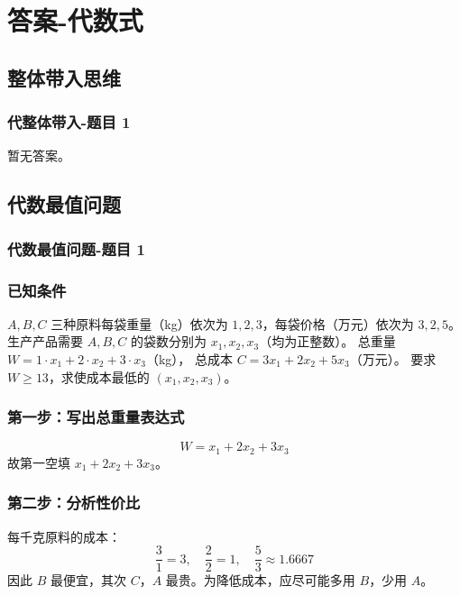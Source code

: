 \chapter{答案-代数式}

\section{整体带入思维}

\subsection{代整体带入-题目 1}

\label{代整体带入-题目 1} 

暂无答案。

\section{代数最值问题}

\subsection{代数最值问题-题目 1}

\label{代数最值问题-题目 1}  %

\subsection*{已知条件}
\(A, B, C\) 三种原料每袋重量（kg）依次为 \(1, 2, 3\)，每袋价格（万元）依次为 \(3, 2, 5\)。  
生产产品需要 \(A, B, C\) 的袋数分别为 \(x_1, x_2, x_3\)（均为正整数）。  
总重量 \(W = 1\cdot x_1 + 2\cdot x_2 + 3\cdot x_3\)（kg），  
总成本 \(C = 3x_1 + 2x_2 + 5x_3\)（万元）。  
要求 \(W \geq 13\)，求使成本最低的 \((x_1, x_2, x_3)\)。

\subsection*{第一步：写出总重量表达式}
\[
W = x_1 + 2x_2 + 3x_3
\]
故第一空填 \(\boxed{x_1 + 2x_2 + 3x_3}\)。

\subsection*{第二步：分析性价比}
每千克原料的成本：
\[
\frac{3}{1}=3,\quad \frac{2}{2}=1,\quad \frac{5}{3}\approx 1.6667
\]
因此 \(B\) 最便宜，其次 \(C\)，\(A\) 最贵。为降低成本，应尽可能多用 \(B\)，少用 \(A\)。


